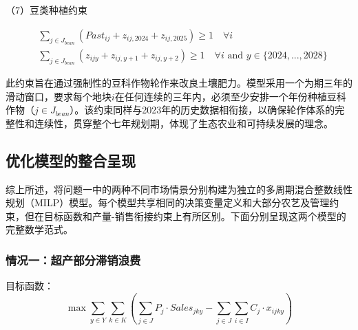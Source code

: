\documentclass[withoutpreface,bwprint]{cumcmthesis} %
\begin{document}
（7）豆类种植约束


\begin{align}
	 & \sum_{j \in J_{bean}} (Past_{ij} + z_{ij,2024} + z_{ij,2025}) \ge 1 \quad \forall i                                  \\
	 & \sum_{j \in J_{bean}} (z_{ijy} + z_{ij,y+1} + z_{ij,y+2}) \ge 1 \quad \forall i \text{ and } y \in \{2024,...,2028\}
\end{align}


此约束旨在通过强制性的豆科作物轮作来改良土壤肥力。模型采用一个为期三年的滑动窗口，要求每个地块$i$在任何连续的三年内，必须至少安排一个年份种植豆科作物（$j \in J_{bean}$）。该约束同样与2023年的历史数据相衔接，以确保轮作体系的完整性和连续性，贯穿整个七年规划期，体现了生态农业和可持续发展的理念。

\subsection{优化模型的整合呈现}

综上所述，将问题一中的两种不同市场情景分别构建为独立的多周期混合整数线性规划（MILP）模型。每个模型共享相同的决策变量定义和大部分农艺及管理约束，但在目标函数和产量-销售衔接约束上有所区别。下面分别呈现这两个模型的完整数学范式。

\subsubsection{情况一：超产部分滞销浪费}

目标函数：
\begin{equation}
	\max \sum_{y \in Y} \sum_{k \in K} \left( \sum_{j \in J} P_j \cdot Sales_{jky} - \sum_{j \in J} \sum_{i \in I} C_j \cdot x_{ijky} \right)
\end{equation}
\end{document}
